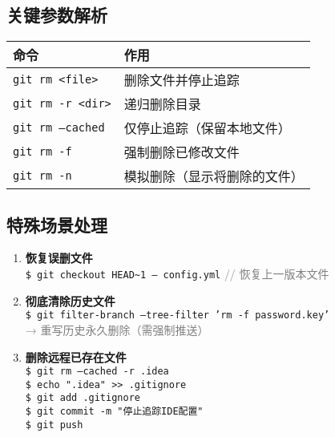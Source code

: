 \subsection{关键参数解析}
\begin{center}
\begin{tabular}{@{}ll@{}}
    \toprule
    \textbf{命令} & \textbf{作用} \\
    \midrule
    \texttt{git rm <file>} & 删除文件并停止追踪 \\
    \texttt{git rm -r <dir>} & 递归删除目录 \\
    \texttt{git rm --cached} & 仅停止追踪（保留本地文件） \\
    \texttt{git rm -f} & 强制删除已修改文件 \\
    \texttt{git rm -n} & 模拟删除（显示将删除的文件） \\
    \bottomrule
\end{tabular}
\end{center}

\subsection{特殊场景处理}
\begin{enumerate}[leftmargin=*, nosep]
    \item \textbf{恢复误删文件} \\
    \texttt{\$ git checkout HEAD\textasciitilde1 -- config.yml} \quad \textcolor{gray}{// 恢复上一版本文件}
    
    \item \textbf{彻底清除历史文件} \\
    \texttt{\$ git filter-branch --tree-filter 'rm -f password.key'} \\
    \textcolor{gray}{→ 重写历史永久删除（需强制推送）}
    
    \item \textbf{删除远程已存在文件} \\
    \texttt{\$ git rm --cached -r .idea} \\
    \texttt{\$ echo ".idea" >> .gitignore} \\
    \texttt{\$ git add .gitignore} \\
    \texttt{\$ git commit -m "停止追踪IDE配置"} \\
    \texttt{\$ git push}
\end{enumerate}

